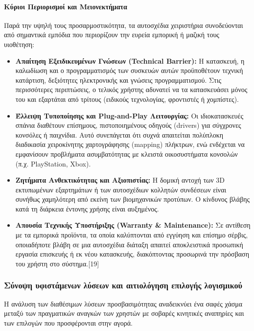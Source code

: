 \documentclass[twoside, a4paper, 11pt]{article}
\newcommand{\textlatin}[1]{\textenglish{#1}}
\begin{document}
\paragraph{Κύριοι Περιορισμοί και Μειονεκτήματα}
Παρά την υψηλή τους προσαρμοστικότητα, τα αυτοσχέδια χειριστήρια συνοδεύονται από σημαντικά εμπόδια που περιορίζουν την ευρεία εμπορική ή μαζική τους υιοθέτηση:

\begin{itemize}
    \item \textbf{Απαίτηση Εξειδικευμένων Γνώσεων (\textlatin{Technical Barrier}):} Η κατασκευή, η καλωδίωση και ο προγραμματισμός των συσκευών αυτών προϋποθέτουν τεχνική κατάρτιση, δεξιότητες ηλεκτρονικής και γνώσεις προγραμματισμού. Στις περισσότερες περιπτώσεις, ο τελικός χρήστης αδυνατεί να τα κατασκευάσει μόνος του και εξαρτάται από τρίτους (ειδικούς τεχνολογίας, φροντιστές ή χομπίστες).
    
    \item \textbf{Έλλειψη Τυποποίησης και \textlatin{Plug-and-Play} Λειτουργίας:} Οι ιδιοκατασκευές σπάνια διαθέτουν επίσημους, πιστοποιημένους οδηγούς (\textlatin{drivers}) για σύγχρονες κονσόλες ή παιχνίδια. Αυτό συνεπάγεται ότι συχνά απαιτείται πολύπλοκη διαδικασία χειροκίνητης χαρτογράφησης (\textlatin{mapping}) πλήκτρων, ενώ ενδέχεται να εμφανίσουν προβλήματα ασυμβατότητας με κλειστά οικοσυστήματα κονσολών (π.χ. \textlatin{PlayStation, Xbox}).
    
    \item \textbf{Ζητήματα Ανθεκτικότητας και Αξιοπιστίας:} Η δομική αντοχή των \textlatin{3D} εκτυπωμένων εξαρτημάτων ή των αυτοσχέδιων κολλητών συνδέσεων είναι συνήθως χαμηλότερη από εκείνη των βιομηχανικών προτύπων. Ο κίνδυνος βλάβης κατά τη διάρκεια έντονης χρήσης είναι αυξημένος.
    
    \item \textbf{Απουσία Τεχνικής Υποστήριξης (\textlatin{Warranty \& Maintenance}):} Σε αντίθεση με τα εμπορικά προϊόντα, τα οποία καλύπτονται από εγγύηση και επίσημο σέρβις, οποιαδήποτε βλάβη σε μια αυτοσχέδια διάταξη απαιτεί αποκλειστικά προσωπική εργασία επισκευής ή εκ νέου κατασκευής, διακόπτοντας προσωρινά την πρόσβαση του χρήστη στο σύστημα.[19]
\end{itemize}

\raggedbottom
\subsubsection{Σύνοψη υφιστάμενων λύσεων και αιτιολόγηση επιλογής λογισμικού}
Η ανάλυση των διαθέσιμων λύσεων προσβασιμότητας αναδεικνύει ένα σαφές χάσμα μεταξύ των πραγματικών αναγκών των χρηστών με σοβαρές κινητικές αναπηρίες και των επιλογών που προσφέρονται
στην αγορά.
\end{document}
